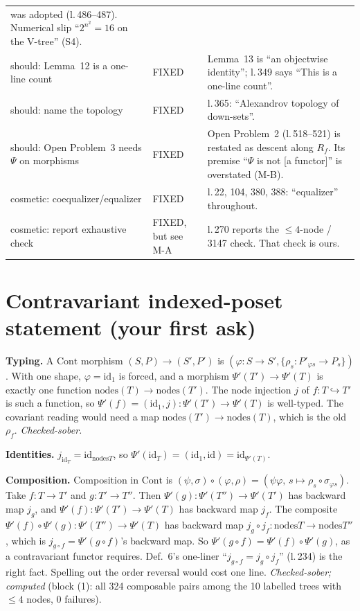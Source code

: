 \documentclass[11pt]{article}
\newcommand{\nodes}{\mathrm{nodes}}
\newcommand{\Cont}{\mathrm{Cont}}
\begin{document}
\begin{center}
\begin{tabular}{p{4.6cm}p{1.7cm}p{9.2cm}}
was adopted (l.\,486--487). Numerical slip ``$2^{n^2}=16$ on the V-tree'' (S4).\\
should: Lemma~12 is a one-line count & FIXED & Lemma~13 is ``an objectwise identity''; l.\,349
says ``This is a one-line count''.\\
should: name the topology & FIXED & l.\,365: ``Alexandrov topology of down-sets''.\\
should: Open Problem~3 needs $\Psi$ on morphisms & FIXED & Open Problem~2 (l.\,518--521) is
restated as descent along $R_f$. Its premise ``$\Psi$ is not [a functor]'' is overstated (M-B).\\
cosmetic: coequalizer/equalizer & FIXED & l.\,22, 104, 380, 388: ``equalizer'' throughout.\\
cosmetic: report exhaustive check & FIXED, but see M-A & l.\,270 reports the $\le4$-node / 3147 check.
That check is ours.\\
\bottomrule
\end{tabular}
\end{center}

\section{Contravariant indexed-poset statement (your first ask)}
\textbf{Typing.} A $\Cont$ morphism $(S,P)\to(S',P')$ is $(\varphi\colon S\to S',\{\rho_s\colon
P'_{\varphi s}\to P_s\})$. With one shape, $\varphi=\mathrm{id}_1$ is forced, and a morphism
$\Psi'(T')\to\Psi'(T)$ is exactly one function $\nodes(T)\to\nodes(T')$. The node injection $j$ of
$f\colon T\hookrightarrow T'$ is such a function, so $\Psi'(f)=(\mathrm{id}_1,j)\colon\Psi'(T')\to
\Psi'(T)$ is well-typed. The covariant reading would need a map $\nodes(T')\to\nodes(T)$, which is
the old $\rho_f$. \emph{Checked-sober.}

\textbf{Identities.} $j_{\mathrm{id}_T}=\mathrm{id}_{\nodes T}$, so $\Psi'(\mathrm{id}_T)=
(\mathrm{id}_1,\mathrm{id})=\mathrm{id}_{\Psi'(T)}$.

\textbf{Composition.} Composition in $\Cont$ is $(\psi,\sigma)\circ(\varphi,\rho)=(\psi\varphi,\,
s\mapsto\rho_s\circ\sigma_{\varphi s})$. Take $f\colon T\to T'$ and $g\colon T'\to T''$. Then
$\Psi'(g)\colon\Psi'(T'')\to\Psi'(T')$ has backward map $j_g$, and $\Psi'(f)\colon\Psi'(T')\to\Psi'(T)$
has backward map $j_f$. The composite $\Psi'(f)\circ\Psi'(g)\colon\Psi'(T'')\to\Psi'(T)$ has backward
map $j_g\circ j_f\colon\nodes T\to\nodes T''$, which is $j_{g\circ f}=\Psi'(g\circ f)$'s backward
map. So $\Psi'(g\circ f)=\Psi'(f)\circ\Psi'(g)$, as a contravariant functor requires. Def.~6's
one-liner ``$j_{g\circ f}=j_g\circ j_f$'' (l.\,234) is the right fact. Spelling out the order
reversal would cost one line. \emph{Checked-sober; computed} (block (1): all 324 composable pairs
among the 10 labelled trees with $\le4$ nodes, 0 failures).
\end{document}
